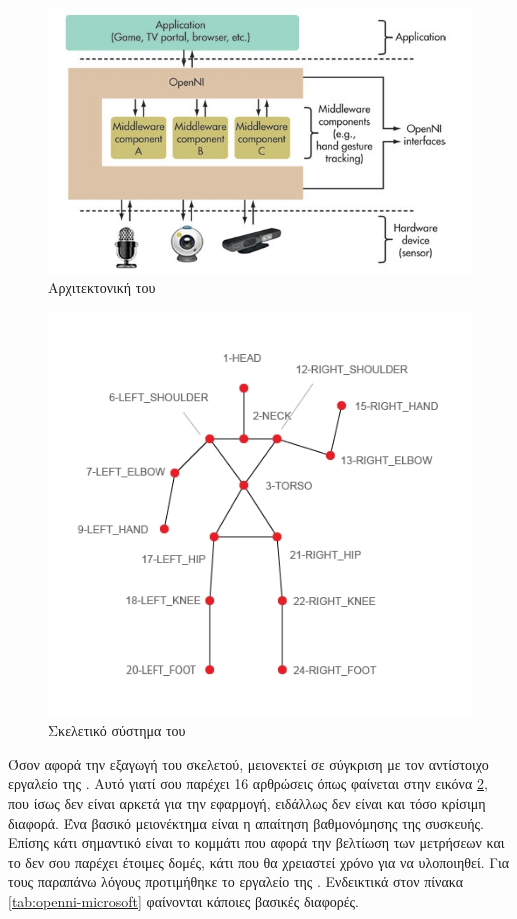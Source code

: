 \begin{figure}[H]
    \centering
    \includegraphics[width=.7\textwidth, height=.3\textheight]{kinect/fig/openni-framework.jpg}
    \caption{Αρχιτεκτονική του \protect\footnotemark}
    \label{fig:openni-framework}
\end{figure}

\begin{figure}[H]
    \centering
    \includegraphics[width=.5\textwidth]{kinect/fig/openni-skeleton.png}
    \caption{Σκελετικό σύστημα του }
    \label{fig:openni-skeleton}
\end{figure}

Όσον αφορά την εξαγωγή του σκελετού, μειονεκτεί σε σύγκριση με τον αντίστοιχο εργαλείο της . Αυτό γιατί σου παρέχει 16 αρθρώσεις όπως φαίνεται στην εικόνα \ref{fig:openni-skeleton}, που ίσως δεν είναι αρκετά για την εφαρμογή, ειδάλλως δεν είναι και τόσο κρίσιμη διαφορά. Ένα βασικό μειονέκτημα είναι η απαίτηση βαθμονόμησης της συσκευής. Επίσης κάτι σημαντικό είναι το κομμάτι που αφορά την βελτίωση των μετρήσεων και το  δεν σου παρέχει έτοιμες δομές, κάτι που θα χρειαστεί χρόνο για να υλοποιηθεί. Για τους παραπάνω λόγους προτιμήθηκε το εργαλείο της . Ενδεικτικά στον πίνακα \ref{tab:openni-microsoft} φαίνονται κάποιες βασικές διαφορές.

